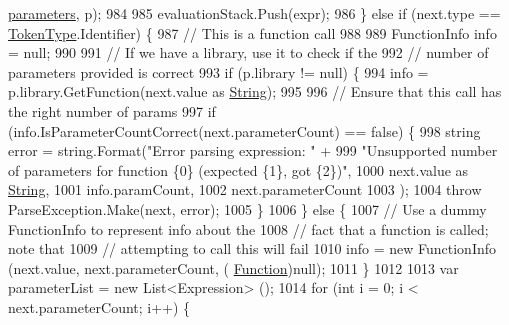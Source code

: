 \begin{DoxyCode}
      \hyperlink{a00098_a7b21380bead8ae08b2cfc6594edab32c}{parameters}, p);
984 
985                         evaluationStack.Push(expr);
986                     \} \textcolor{keywordflow}{else} \textcolor{keywordflow}{if} (next.type == \hyperlink{a00045_a301aa7c866593a5b625a8fc158bbeace}{TokenType}.Identifier) \{
987                         \textcolor{comment}{// This is a function call}
988 
989                         FunctionInfo info = null;
990 
991                         \textcolor{comment}{// If we have a library, use it to check if the}
992                         \textcolor{comment}{// number of parameters provided is correct}
993                         \textcolor{keywordflow}{if} (p.library != null) \{
994                             info = p.library.GetFunction(next.value as \hyperlink{a00045_a301aa7c866593a5b625a8fc158bbeacea27118326006d3829667a400ad23d5d98}{String});
995 
996                             \textcolor{comment}{// Ensure that this call has the right number of params}
997                             \textcolor{keywordflow}{if} (info.IsParameterCountCorrect(next.parameterCount) == \textcolor{keyword}{false}) \{
998                                 \textcolor{keywordtype}{string} error = string.Format(\textcolor{stringliteral}{"Error parsing expression: "} +
999                                     \textcolor{stringliteral}{"Unsupported number of parameters for function \{0\} (expected \{1\}, got
       \{2\})"},
1000                                     next.value as \hyperlink{a00045_a301aa7c866593a5b625a8fc158bbeacea27118326006d3829667a400ad23d5d98}{String},
1001                                     info.paramCount,
1002                                     next.parameterCount
1003                                 );
1004                                 \textcolor{keywordflow}{throw} ParseException.Make(next, error);
1005                             \}
1006                         \} \textcolor{keywordflow}{else} \{
1007                             \textcolor{comment}{// Use a dummy FunctionInfo to represent info about the}
1008                             \textcolor{comment}{// fact that a function is called; note that}
1009                             \textcolor{comment}{// attempting to call this will fail}
1010                             info = \textcolor{keyword}{new} FunctionInfo (next.value, next.parameterCount, (
      \hyperlink{a00045_ae0be2e5cf13d5779816102439e61ff1a}{Function})null);
1011                         \}
1012 
1013                         var parameterList = \textcolor{keyword}{new} List<Expression> ();
1014                         \textcolor{keywordflow}{for} (\textcolor{keywordtype}{int} i = 0; i < next.parameterCount; i++) \{

\end{DoxyCode}
